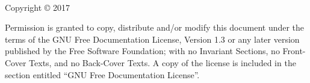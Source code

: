 
\thispagestyle{empty}

\begin{titlepage}

\thispagestyle{empty}

~\vfill

\begin{center}

\huge \doctitle

\Large \docsubtitle

\bigskip

\normalsize \docauthor

\end{center}

\vfill

\end{titlepage}

\thispagestyle{empty}

\noindent Copyright \copyright{} 2017\ \ \docauthor

\bigskip

\noindent \docsite

\bigskip

\noindent Permission is granted to copy, distribute and/or modify this
document under the terms of the GNU Free Documentation License, Version
1.3 or any later version published by the Free Software Foundation; with
no Invariant Sections, no Front-Cover Texts, and no Back-Cover Texts.  A
copy of the license is included in the section entitled ``GNU Free
Documentation License''.

